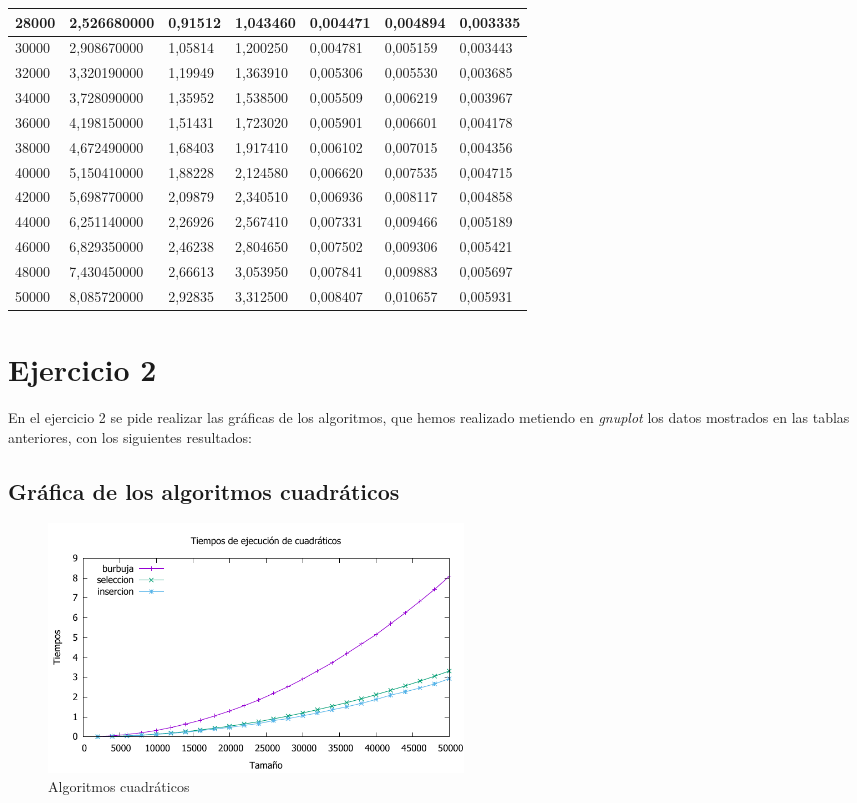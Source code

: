 \documentclass[a4paper, 11pt]{article}
\begin{document}
\begin{tabular}{|l|l|l|l|l|l|l|}
	28000&	2,526680000&	0,91512&	1,043460&	0,004471&	0,004894&	0,003335\\
	\hline
	30000&	2,908670000&	1,05814&	1,200250&	0,004781&	0,005159&	0,003443\\
	\hline
	32000&	3,320190000&	1,19949&	1,363910&	0,005306&	0,005530&	0,003685\\
	\hline
	34000&	3,728090000&	1,35952&	1,538500&	0,005509&	0,006219&	0,003967\\
	\hline
	36000&	4,198150000&	1,51431&	1,723020&	0,005901&	0,006601&	0,004178\\
	\hline
	38000&	4,672490000&	1,68403&	1,917410&	0,006102&	0,007015&	0,004356\\
	\hline
	40000&	5,150410000&	1,88228&	2,124580&	0,006620&	0,007535&	0,004715\\
	\hline
	42000&	5,698770000&	2,09879&	2,340510&	0,006936&	0,008117&	0,004858\\
	\hline
	44000&	6,251140000&	2,26926&	2,567410&	0,007331&	0,009466&	0,005189\\
	\hline
	46000&	6,829350000&	2,46238&	2,804650&	0,007502&	0,009306&	0,005421\\
	\hline
	48000&	7,430450000&	2,66613&	3,053950&	0,007841&	0,009883&	0,005697\\
	\hline
	50000&	8,085720000&	2,92835&	3,312500&	0,008407&	0,010657&	0,005931\\
	\hline
\end{tabular}

\newpage
\section{Ejercicio 2}

En el ejercicio 2 se pide realizar las gráficas de los algoritmos, que hemos
realizado metiendo en \textit{gnuplot} los datos mostrados en las tablas anteriores,
con los siguientes resultados:

\subsection{Gráfica de los algoritmos cuadráticos}
\begin{figure}[h] \includegraphics[width=11cm]{comparativa_cuadraticos_g} \centering
	\caption{Algoritmos cuadráticos} \end{figure}
\end{document}
